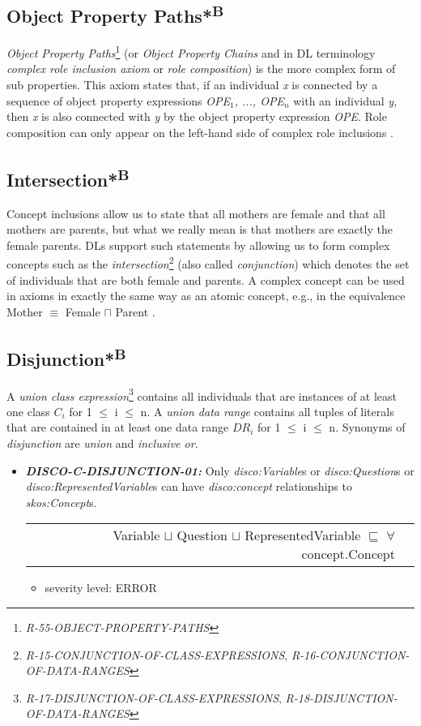 \documentclass{llncs}
\newenvironment{DL}{
  \vspace{0cm}
  \begin{tabular}{r l}

}{
  \end{tabular}
}
\begin{document}
\subsection{Object Property Paths*\textsuperscript{B}}

\emph{Object Property Paths}\footnote{\emph{R-55-OBJECT-PROPERTY-PATHS}} (or \emph{Object Property Chains} and in DL terminology \emph{complex role inclusion axiom} or \emph{role composition}) is the more complex form of sub properties. 
This axiom states that, if an individual \emph{x} is connected by a sequence of object property expressions \emph{OPE$_1$, ..., OPE$_n$} with an individual \emph{y}, then \emph{x} is also connected with \emph{y} by the object property expression \emph{OPE}.  
Role composition can only appear on the left-hand side of complex role inclusions \cite{Kroetzsch2012}.

\subsection{Intersection*\textsuperscript{B}}

Concept inclusions allow us to state that all mothers are female and that
all mothers are parents, but what we really mean is that mothers are exactly the female
parents. DLs support such statements by allowing us to form complex concepts such as
the \emph{intersection}\footnote{\emph{R-15-CONJUNCTION-OF-CLASS-EXPRESSIONS}, \emph{R-16-CONJUNCTION-OF-DATA-RANGES}} (also called \emph{conjunction})
which denotes the set of individuals that are both female and parents. A complex concept
can be used in axioms in exactly the same way as an atomic concept, e.g., in the
equivalence Mother $\equiv$ Female $\sqcap$ Parent .

\subsection{Disjunction*\textsuperscript{B}}

A \emph{union class expression}\footnote{{\em R-17-DISJUNCTION-OF-CLASS-EXPRESSIONS}, {\em R-18-DISJUNCTION-OF-DATA-RANGES}} contains all individuals that are instances of at least one class $C_{i}$ for 1 $\leq$ i $\leq$ n. 
A \emph{union data range} contains all tuples of literals that are contained in at least one data range $DR_{i}$ for 1 $\leq$ i $\leq$ n.
Synonyms of {\em disjunction} are {\em union} and {\em inclusive or}.

\begin{itemize}
	\item \textbf{{\em DISCO-C-DISJUNCTION-01:}} 
Only {\em disco:Variable}s or {\em disco:Question}s or {\em disco:RepresentedVariable}s can have {\em disco:concept} relationships to {\em skos:Concept}s.

\begin{DL}
Variable $\sqcup$ Question $\sqcup$ RepresentedVariable $\sqsubseteq$ $\forall$ concept.Concept \\
\end{DL}
\begin{itemize}
	\item severity level: ERROR
\end{itemize}
\end{itemize}
\end{document}
